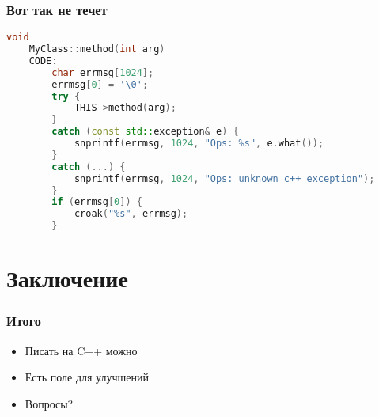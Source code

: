 \documentclass[utf8x]{beamer}
\begin{document}
\begin{frame}[fragile]
    \frametitle{Вот так не течет}
    \begin{lstlisting}[language=C++,style=PerlXS]
    void
    MyClass::method(int arg)
    CODE:
        char errmsg[1024];
        errmsg[0] = '\0';
        try {
            THIS->method(arg);
        }
        catch (const std::exception& e) {
            snprintf(errmsg, 1024, "Ops: %s", e.what());
        }
        catch (...) {
            snprintf(errmsg, 1024, "Ops: unknown c++ exception");
        }
        if (errmsg[0]) {
            croak("%s", errmsg);
        }
    \end{lstlisting}
\end{frame}

\section{Заключение}

\begin{frame}
    \frametitle{Итого}
    \begin{itemize}[<+->]
        \item Писать на C++ можно
        \item Есть поле для улучшений
        \item Вопросы?
    \end{itemize}
\end{frame}
\end{document}
